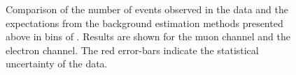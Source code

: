 


\begin{figure}[h!]
\centering
{}\quad
{}\quad
\caption[Comparison of predicted and observed event yields in bins of
\STlep]{Comparison of the number of events observed in the data and the
  expectations from the background estimation methods presented above in bins of
  \STlep. Results are shown for  the muon channel and
   the electron channel.  The red error-bars indicate
  the statistical uncertainty of the data.}
\label{fig:susy_pred}
\end{figure}
